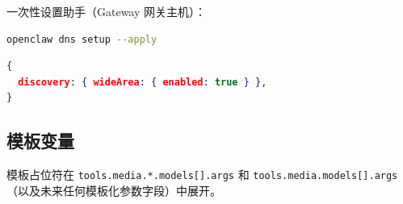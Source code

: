 一次性设置助手（Gateway 网关主机）：

\begin{lstlisting}[language=bash]
openclaw dns setup --apply
\end{lstlisting}


\begin{lstlisting}[language=json]
{
  discovery: { wideArea: { enabled: true } },
}
\end{lstlisting}


\subsection{模板变量}


模板占位符在 \texttt{tools.media.*.models[].args} 和 \texttt{tools.media.models[].args}（以及未来任何模板化参数字段）中展开。


